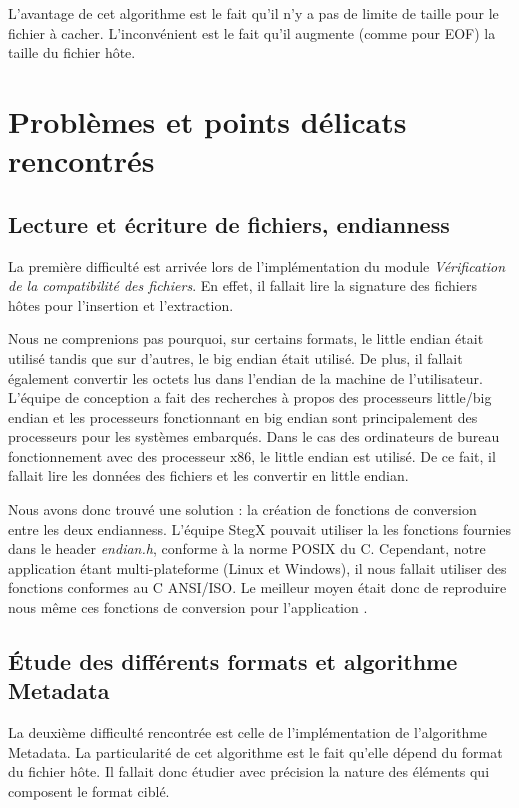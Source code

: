 \documentclass[11pt]{article}
\begin{document}
L'avantage de cet algorithme est le fait qu'il n'y a pas de limite de 
taille pour le fichier à cacher.  L'inconvénient est le fait qu'il augmente 
(comme pour EOF) la taille du fichier hôte.  

\section{Problèmes et points délicats rencontrés}

\subsection{Lecture et écriture de fichiers, endianness}

La première difficulté est arrivée lors de l'implémentation du module 
\textit{Vérification de la compatibilité des fichiers}. En effet, il fallait 
lire la signature des fichiers hôtes pour l'insertion et l'extraction. 

Nous ne comprenions pas pourquoi, sur certains formats, le little endian était
utilisé tandis que sur d'autres, le big endian était utilisé. De plus, il
fallait également convertir les octets lus dans l'endian de la machine de
l'utilisateur. L'équipe de conception a fait des recherches à propos des
processeurs little/big endian et les processeurs fonctionnant en big endian sont
principalement des processeurs pour les systèmes embarqués. Dans le cas des
ordinateurs de bureau fonctionnement avec des processeur x86, le little endian
est utilisé. De ce fait, il fallait lire les données des fichiers et les
convertir en little endian. 

Nous avons donc trouvé une solution : la création de fonctions de conversion
entre les deux endianness. L'équipe StegX pouvait utiliser la les fonctions
fournies dans le header \textit{endian.h}, conforme à la norme POSIX du C.
Cependant, notre application étant multi-plateforme (Linux et Windows), il nous
fallait utiliser des fonctions conformes au C ANSI/ISO. Le meilleur moyen était
donc de reproduire nous même ces fonctions de conversion pour l'application 
\label{endian}. 

\subsection{Étude des différents formats et algorithme Metadata}

La deuxième difficulté rencontrée est celle de l'implémentation de l'algorithme
Metadata. La particularité de cet algorithme est le fait qu'elle dépend du
format du fichier hôte. Il fallait donc étudier avec précision la nature 
des éléments qui composent le format ciblé.  
\end{document}
